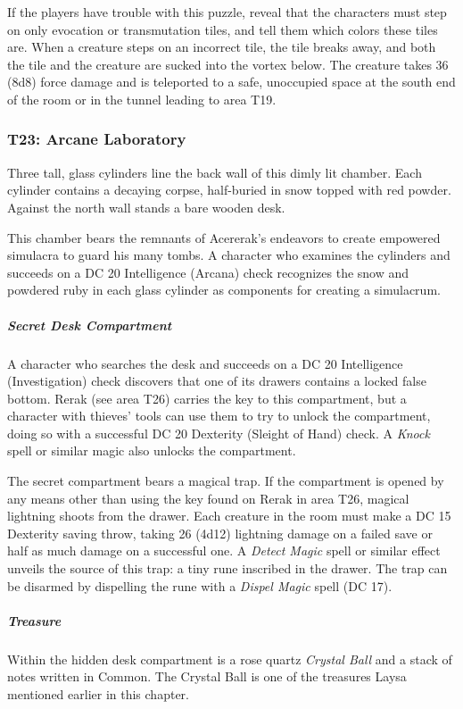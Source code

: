 \documentclass[10pt,a4paper,twoside,bg=print,twocolumn,openany,nodeprecatedcode]{dndbook}
\begin{document}
If the players have trouble with this puzzle, reveal that the characters must step on only evocation or transmutation tiles, and tell them which colors these tiles are. When a creature steps on an incorrect tile, the tile breaks away, and both the tile and the creature are sucked into the vortex below. The creature takes 36 (8d8) force damage and is teleported to a safe, unoccupied space at the south end of the room or in the tunnel leading to area T19.

\subsubsection{T23: Arcane Laboratory}
\begin{DndReadAloud}{}
Three tall, glass cylinders line the back wall of this dimly lit chamber. Each cylinder contains a decaying corpse, half-buried in snow topped with red powder. Against the north wall stands a bare wooden desk.

\end{DndReadAloud}

This chamber bears the remnants of Acererak's endeavors to create empowered simulacra to guard his many tombs. A character who examines the cylinders and succeeds on a DC 20 Intelligence (Arcana) check recognizes the snow and powdered ruby in each glass cylinder as components for creating a simulacrum.

\subparagraph{Secret Desk Compartment}
A character who searches the desk and succeeds on a DC 20 Intelligence (Investigation) check discovers that one of its drawers contains a locked false bottom. Rerak (see area T26) carries the key to this compartment, but a character with thieves' tools can use them to try to unlock the compartment, doing so with a successful DC 20 Dexterity (Sleight of Hand) check. A \textit{Knock} spell or similar magic also unlocks the compartment.

The secret compartment bears a magical trap. If the compartment is opened by any means other than using the key found on Rerak in area T26, magical lightning shoots from the drawer. Each creature in the room must make a DC 15 Dexterity saving throw, taking 26 (4d12) lightning damage on a failed save or half as much damage on a successful one. A \textit{Detect Magic} spell or similar effect unveils the source of this trap: a tiny rune inscribed in the drawer. The trap can be disarmed by dispelling the rune with a \textit{Dispel Magic} spell (DC 17).

\subparagraph{Treasure}
Within the hidden desk compartment is a rose quartz \textit{Crystal Ball} and a stack of notes written in Common. The Crystal Ball is one of the treasures Laysa mentioned earlier in this chapter.
\end{document}
